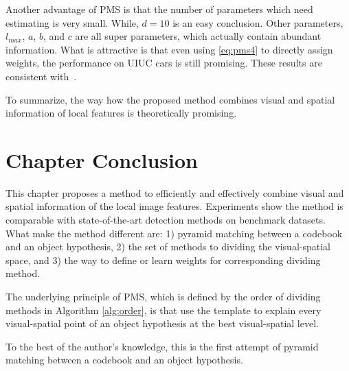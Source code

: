 Another advantage of PMS is that the number of parameters which need estimating is very small. While, $d=10$ is an easy conclusion. Other parameters, $l_{max}$, $a$, $b$, and $c$ are all super parameters, which actually contain abundant information. What is attractive is that even using \ref{eq:pms4} to directly assign weights, the performance on UIUC cars is still promising. These results are consistent with~\citep{pmk}.

To summarize, the way how the proposed method combines visual and spatial information of local features is theoretically promising.

\section{Chapter Conclusion}
\label{conc5}
This chapter proposes a method to efficiently and effectively combine visual and spatial information of the local image features. Experiments show the method is comparable with state-of-the-art detection methods on benchmark datasets. What make the method different are: 1) pyramid matching between a codebook and an  object hypothesis, 2) the set of methods to dividing the visual-spatial space, and 3) the way to define or learn weights for corresponding dividing method.

The underlying principle of PMS, which is defined by the order of dividing methods in Algorithm \ref{alg:order}, is that use the template to explain every visual-spatial point of an object hypothesis at the best visual-spatial level.

To the best of the author's knowledge, this is the first attempt of pyramid matching between a codebook and an object hypothesis.

